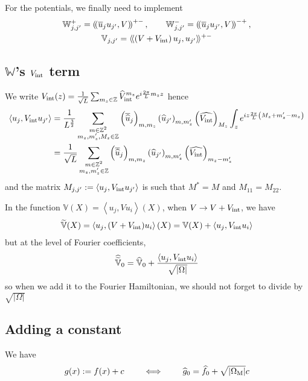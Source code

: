 \documentclass[11pt,a4paper,reqno,french,tikz]{amsart}
\newcommand{\pa}[1]{\left( #1 \right)} %
\newcommand{\ab}[1]{\left|#1\right|} %
\newcommand{\ps}[1]{\left< #1 \right>} %
\newcommand{\f}[2]{\frac{#1}{#2}} %
\newcommand{\ind}[1]{_{\textup{#1}}} %
\newcommand{\bbV}{\mathbb{V}}
\newcommand{\db}[1]{\left(\!\left( #1 \right)\!\right)}
\def\bbV{{\mathbb V}}
\def\bbW{{\mathbb W}}
\newcommand{\sqom}{\sqrt{\ab{\Omega\ind{M}}}}
\def\lAngle{\langle\!\langle}
\def\rAngle{\rangle\!\rangle}
\begin{document}
For the potentials, we finally need to implement
\begin{multline*}
\bbW_{j,j'}^+ = \db{\overline{u}_j u_{j'}, V}^{+-}, \qquad \bbW_{j,j'}^- = \db{\overline{u}_j u_{j'}, V}^{-+},\\
\bbV_{j,j'} = \lAngle \pa{V+V\ind{int}} u_j , u_{j'} \rAngle^{+-}
\end{multline*}




\subsection{$\bbW$'s $V\ind{int}$ term}%
\label{sub:_bbw_s_vint_term}
We write $V\ind{int}(z) = \f{1}{\sqrt{L}} \sum_{m_z \in \Z} \widehat{V}\ind{int}^{m_z} e^{i \f{2\pi}L m_z z}$ hence
\begin{align*}
	\ps{u_j, V\ind{int} u_{j'}} &= \f{1}{L^{\f 32}} \sum_{\substack{m \in \Z^2 \\ m_z,m_z',M_z \in \Z}} \pa{\overline{\widehat{u}}_j}_{m,m_z} \pa{\widehat{u}_{j'}}_{m,m_z'}\pa{\widehat{V\ind{int}}}_{M_z} \int_z e^{iz \f{2\pi}{L} \pa{M_z + m_z'-m_z}} \\
& = \f{1}{\sqrt{L}} \sum_{\substack{m \in \Z^2 \\ m_z,m_z' \in \Z}} \pa{\overline{\widehat{u}}_j}_{m,m_z} \pa{\widehat{u}_{j'}}_{m,m_z'}\pa{\widehat{V\ind{int}}}_{m_z-m_z'} 
\end{align*}
and the matrix $M_{j,j'} := \ps{u_j, V\ind{int} u_{j'}}$ is such that $M^* = M$ and $M_{11} = M_{22}$.

In the function $\bbV(X) = \ps{u_j,V u_i}(X)$, when $V \rightarrow V+ V\ind{int}$, we have 
\begin{align*}
\widetilde{\bbV}(X) = \ps{u_j,(V+V\ind{int}) u_i}(X) = \bbV(X) + \ps{u_j,V\ind{int} u_i}
\end{align*}
but at the level of Fourier coefficients,
\begin{align*}
\widehat{\widetilde{\bbV}}_0 = \widehat{\bbV}_0 + \f{\ps{u_j,V\ind{int} u_i}}{\sqrt{\ab{\Omega}}}
\end{align*}
so when we add it to the Fourier Hamiltonian, we should not forget to divide by $\sqrt{\ab{\Omega}}$

\subsection{Adding a constant}%
\label{sub:adding_a_constant}
We have
\begin{align*}
g(x) := f(x) + c \qquad \iff \qquad \widehat{g}_0 = \widehat{f}_0 + \sqom c
\end{align*}
\end{document}
